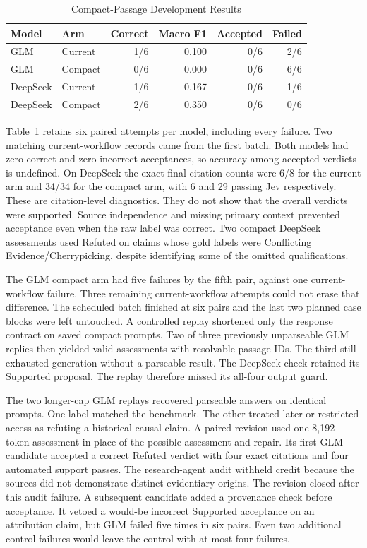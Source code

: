 \documentclass[conference]{IEEEtran}
\begin{document}
\begin{table}[t]
\caption{Compact-Passage Development Results}
\label{tab:flash-dev}
\centering
\footnotesize
\begin{tabular}{@{}llrrrr@{}}
\toprule
Model & Arm & Correct & Macro F1 & Accepted & Failed\\
\midrule
GLM & Current & 1/6 & 0.100 & 0/6 & 2/6\\
GLM & Compact & 0/6 & 0.000 & 0/6 & 6/6\\
DeepSeek & Current & 1/6 & 0.167 & 0/6 & 1/6\\
DeepSeek & Compact & 2/6 & 0.350 & 0/6 & 0/6\\
\bottomrule
\end{tabular}
\end{table}

Table~\ref{tab:flash-dev} retains six paired attempts per model, including every failure. Two matching current-workflow records came from the first batch. Both models had zero correct and zero incorrect acceptances, so accuracy among accepted verdicts is undefined. On DeepSeek the exact final citation counts were 6/8 for the current arm and 34/34 for the compact arm, with 6 and 29 passing Jev respectively. These are citation-level diagnostics. They do not show that the overall verdicts were supported. Source independence and missing primary context prevented acceptance even when the raw label was correct. Two compact DeepSeek assessments used Refuted on claims whose gold labels were Conflicting Evidence/Cherrypicking, despite identifying some of the omitted qualifications.

The GLM compact arm had five failures by the fifth pair, against one current-workflow failure. Three remaining current-workflow attempts could not erase that difference. The scheduled batch finished at six pairs and the last two planned case blocks were left untouched. A controlled replay shortened only the response contract on saved compact prompts. Two of three previously unparseable GLM replies then yielded valid assessments with resolvable passage IDs. The third still exhausted generation without a parseable result. The DeepSeek check retained its Supported proposal. The replay therefore missed its all-four output guard.

The two longer-cap GLM replays recovered parseable answers on identical prompts. One label matched the benchmark. The other treated later or restricted access as refuting a historical causal claim. A paired revision used one 8,192-token assessment in place of the possible assessment and repair. Its first GLM candidate accepted a correct Refuted verdict with four exact citations and four automated support passes. The research-agent audit withheld credit because the sources did not demonstrate distinct evidentiary origins. The revision closed after this audit failure. A subsequent candidate added a provenance check before acceptance. It vetoed a would-be incorrect Supported acceptance on an attribution claim, but GLM failed five times in six pairs. Even two additional control failures would leave the control with at most four failures.
\end{document}
